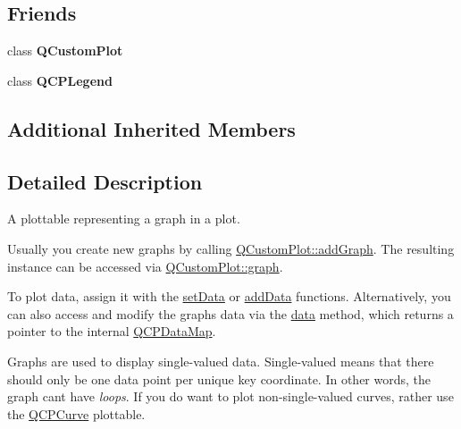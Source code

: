 \subsection*{Friends}
\begin{DoxyCompactItemize}
\item 
\mbox{\label{class_q_c_p_graph_a1cdf9df76adcfae45261690aa0ca2198}} 
class {\bfseries Q\+Custom\+Plot}
\item 
\mbox{\label{class_q_c_p_graph_a8429035e7adfbd7f05805a6530ad5e3b}} 
class {\bfseries Q\+C\+P\+Legend}
\end{DoxyCompactItemize}
\subsection*{Additional Inherited Members}


\subsection{Detailed Description}
A plottable representing a graph in a plot. 



Usually you create new graphs by calling \hyperlink{class_q_custom_plot_a6fb2873d35a8a8089842d81a70a54167}{Q\+Custom\+Plot\+::add\+Graph}. The resulting instance can be accessed via \hyperlink{class_q_custom_plot_a6ecae130f684b25276fb47bd3a5875c6}{Q\+Custom\+Plot\+::graph}.

To plot data, assign it with the \hyperlink{class_q_c_p_graph_a1df2fd710545c8ba3b2c99a39a27bf8b}{set\+Data} or \hyperlink{class_q_c_p_graph_aa5c6181d84db72ce4dbe9dc15a34ef4f}{add\+Data} functions. Alternatively, you can also access and modify the graph\textquotesingle{}s data via the \hyperlink{class_q_c_p_graph_acde1c0d1f6a817930489548396e6b3e6}{data} method, which returns a pointer to the internal \hyperlink{qcustomplot_8h_a84a9c4a4c2216ccfdcb5f3067cda76e3}{Q\+C\+P\+Data\+Map}.

Graphs are used to display single-\/valued data. Single-\/valued means that there should only be one data point per unique key coordinate. In other words, the graph can\textquotesingle{}t have {\itshape loops}. If you do want to plot non-\/single-\/valued curves, rather use the \hyperlink{class_q_c_p_curve}{Q\+C\+P\+Curve} plottable.

